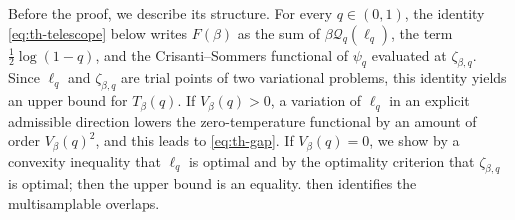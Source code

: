 Before the proof, we describe its structure. For every $q\in(0,1)$, the identity \eqref{eq:th-telescope} below writes $F(\beta)$ as the sum of $\beta\mathcal Q_q(\ell_q)$, the term $\frac12\log(1-q)$, and the Crisanti--Sommers functional of $\psi_q$ evaluated at $\zeta_{\beta,q}$. Since $\ell_q$ and $\zeta_{\beta,q}$ are trial points of two variational problems, this identity yields an upper bound for $T_\beta(q)$. If $V_\beta(q)>0$, a variation of $\ell_q$ in an explicit admissible direction lowers the zero-temperature functional by an amount of order $V_\beta(q)^2$, and this leads to \eqref{eq:th-gap}. If $V_\beta(q)=0$, we show by a convexity inequality that $\ell_q$ is optimal and by the optimality criterion that $\zeta_{\beta,q}$ is optimal; then the upper bound is an equality.  then identifies the multisamplable overlaps.

